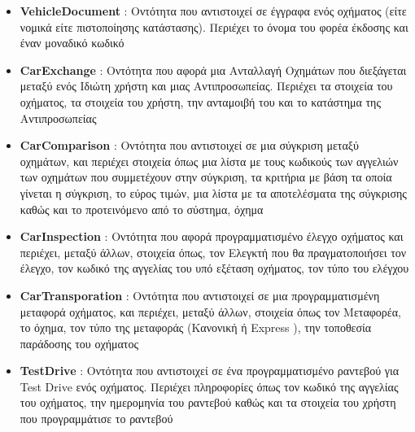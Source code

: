 \documentclass{../ol-softwaremanual}
\begin{document}
\begin{itemize}
		\item \en \textbf{VehicleDocument} \gr : Οντότητα που αντιστοιχεί σε έγγραφα ενός οχήματος (είτε νομικά είτε πιστοποίησης κατάστασης). Περιέχει το όνομα του φορέα έκδοσης και έναν μοναδικό κωδικό
		\item \en \textbf{CarExchange} \gr : Οντότητα που αφορά μια Ανταλλαγή Οχημάτων που διεξάγεται μεταξύ ενός Ιδιώτη χρήστη και μιας Αντιπροσωπείας. Περιέχει τα στοιχεία του οχήματος, τα στοιχεία του χρήστη, την ανταμοιβή του και το κατάστημα της Αντιπροσωπείας 
		\item \en \textbf{CarComparison} \gr : Οντότητα που αντιστοιχεί σε μια σύγκριση μεταξύ οχημάτων, και περιέχει στοιχεία όπως μια λίστα με τους κωδικούς των αγγελιών των οχημάτων που συμμετέχουν στην σύγκριση, τα κριτήρια με βάση τα οποία γίνεται η σύγκριση, το εύρος τιμών, μια λίστα με τα αποτελέσματα της σύγκρισης καθώς και το προτεινόμενο από το σύστημα, όχημα
		\item \en \textbf{CarInspection} \gr : Οντότητα που αφορά προγραμματισμένο έλεγχο οχήματος και περιέχει, μεταξύ άλλων, στοιχεία όπως, τον Ελεγκτή που θα πραγματοποιήσει τον έλεγχο, τον κωδικό της αγγελίας του υπό εξέταση οχήματος, τον τύπο του ελέγχου
		\item \en \textbf{CarTransporation} \gr : Οντότητα που αντιστοιχεί σε μια προγραμματισμένη μεταφορά οχήματος, και περιέχει, μεταξύ άλλων, στοιχεία όπως τον Μεταφορέα, το όχημα, τον τύπο της μεταφοράς (Κανονική ή \en Express \gr), την τοποθεσία παράδοσης του οχήματος
		\item \en \textbf{TestDrive} \gr : Οντότητα που αντιστοιχεί σε ένα προγραμματισμένο ραντεβού για \en Test Drive \gr ενός οχήματος. Περιέχει πληροφορίες όπως τον κωδικό της αγγελίας του οχήματος, την ημερομηνία του ραντεβού καθώς και τα στοιχεία του χρήστη που προγραμμάτισε το ραντεβού

\end{itemize}
\end{document}
